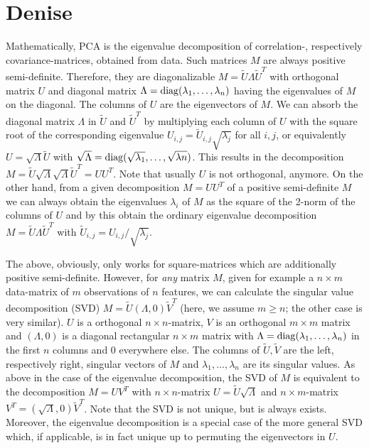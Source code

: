 \section{Denise}\label{sec:algorithm}

Mathematically, PCA is the eigenvalue decomposition of correlation-, respectively covariance-matrices, obtained from data. Such matrices $M$ are always positive semi-definite. Therefore, they are diagonalizable $M = \tilde{U}\Lambda \tilde{U}^T$ with orthogonal matrix $U$ and diagonal matrix $\Lambda = \mathrm{diag}(\lambda_1,\dots,\lambda_n)$ having the eigenvalues of $M$ on the diagonal. The columns of $U$ are the eigenvectors of $M$. We can absorb the diagonal matrix $\Lambda$ in $\tilde{U}$ and $\tilde{U}^T$ by multiplying each column of $U$ with the square root of the corresponding eigenvalue $U_{i,j} = \tilde{U}_{i,j} \sqrt{\lambda_j}$ for all $i,j$, or equivalently $U = \sqrt{\Lambda}\tilde{U}$ with $\sqrt{\Lambda} = \mathrm{diag}(\sqrt{\lambda_1},\dots,\sqrt{\lambda{n}})$. This results in the decomposition $M = \tilde{U}\sqrt{\Lambda} \sqrt{\Lambda} \tilde{U}^T = UU^T$. Note that usually $U$ is not orthogonal, anymore. On the other hand, from a given decomposition $M = UU^T$ of a positive semi-definite $M$ we can always obtain the eigenvalues $\lambda_i$ of $M$ as the square of the 2-norm of the columns of $U$ and by this obtain the ordinary eigenvalue decomposition $M = \tilde{U}\Lambda\tilde{U}^T$ with $\tilde{U}_{i,j} = U_{i,j}/\sqrt{\lambda_j}$.

The above, obviously, only works for square-matrices which are additionally positive semi-definite. However, for \textit{any} matrix $M$, given for example a $n\times m$ data-matrix of $m$ observations of $n$ features, we can calculate the singular value decomposition (SVD) $M = \tilde{U} (\Lambda, 0) \tilde{V}^T$ (here, we assume $m\geq n$; the other case is very similar). $U$ is a orthogonal $n\times n$-matrix, $V$ is an orthogonal $m\times m$ matrix and $(\Lambda, 0)$ is a diagonal rectangular $n\times m$ matrix with $\Lambda = \mathrm{diag}(\lambda_1,\dots,\lambda_n)$ in the first $n$ columns and $0$ everywhere else. The columns of $\tilde{U},\tilde{V}$ are the left, respectively right, singular vectors of $M$ and $\lambda_1,\dots,\lambda_n$ are its singular values. As above in the case of the eigenvalue decomposition, the SVD of $M$ is equivalent to the decomposition $M = UV^T$ with $n\times n$-matrix $U = \tilde{U}\sqrt{\Lambda}$ and $n\times m$-matrix $V^T = (\sqrt{\Lambda}, 0) \tilde{V}^T$. Note that the SVD is not unique, but is always exists. Moreover, the eigenvalue decomposition is a special case of the more general SVD which, if applicable, is in fact unique up to permuting the eigenvectors in $U$.

